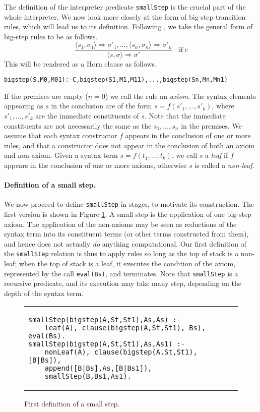 \documentclass{llncs}
\begin{document}
The definition of the interpreter predicate \texttt{smallStep} is the crucial part of the whole interpreter.
We now look more closely at the form of big-step transition rules, which will lead us to its definition. 
Following \cite{NielsonN1992}, we take the general form of big-step rules to
be as follows.
\[
\dfrac{\langle s_1, \sigma_1\rangle \Longrightarrow \sigma'_1, \ldots, \langle s_n, \sigma_n\rangle \Longrightarrow \sigma'_n}
{\langle s, \sigma\rangle \Longrightarrow \sigma'} 
~~~~\mathrm{if }~ c
\]
This will be rendered as a Horn clause as follows.
\begin{lstlisting}
bigstep(S,M0,M01):-C,bigstep(S1,M1,M11),...,bigstep(Sn,Mn,Mn1)
\end{lstlisting}
If the premises are empty ($n=0$) we call the rule an \emph{axiom}.  The syntax elements appearing as $s$ in the conclusion 
are of the form $s=f(s'_1,\ldots,s'_k)$, where $s'_1,\ldots,s'_k$ are the immediate constituents of $s$.  Note that the immediate constituents 
are not necessarily the same as the $s_1,\ldots,s_n$ in the premises.  We assume that each syntax constructor $f$ appears in the conclusion
of one or more rules, and that a constructor does not appear in the conclusion of both an axiom and non-axiom. Given a syntax term $s=f(t_1,\ldots,t_k)$,
we call $s$ a \emph{leaf} if $f$ appears in the conclusion of one or more axioms, otherwise $s$ is called a \emph{non-leaf}.

\paragraph{Definition of a small step.} We now proceed to define \texttt{smallStep} in stages, to motivate its construction.
The first version is shown in Figure \ref{fig:linear-smallstep}.
A small step is the application of one big-step axiom.  
The application of the non-axioms may be seen as reductions of the syntax
term into its constituent terms (or other terms constructed from them), and hence does not actually \emph{do} anything computational.
Our first definition of the \texttt{smallStep} relation is thus to apply rules so long as the top of stack is a non-leaf; when 
the top of stack is a leaf, it executes the condition of the axiom, represented by the call \texttt{eval(Bs)}, and terminates.  
Note that \texttt{smallStep}
is a recursive predicate, and its execution may take many step, depending on the depth of the syntax term.

\begin{figure}
\begin{tabular}{l}
\begin{lstlisting}
smallStep(bigstep(A,St,St1),As,As) :- 
    leaf(A), clause(bigstep(A,St,St1), Bs), eval(Bs).
smallStep(bigstep(A,St,St1),As,As1) :- 
    nonLeaf(A), clause(bigstep(A,St,St1), [B|Bs]),
    append([B|Bs],As,[B|Bs1]),
    smallStep(B,Bs1,As1).
\end{lstlisting}
\end{tabular}
\caption{First definition of a small step.}\label{fig:linear-smallstep}
\end{figure}
\end{document}
